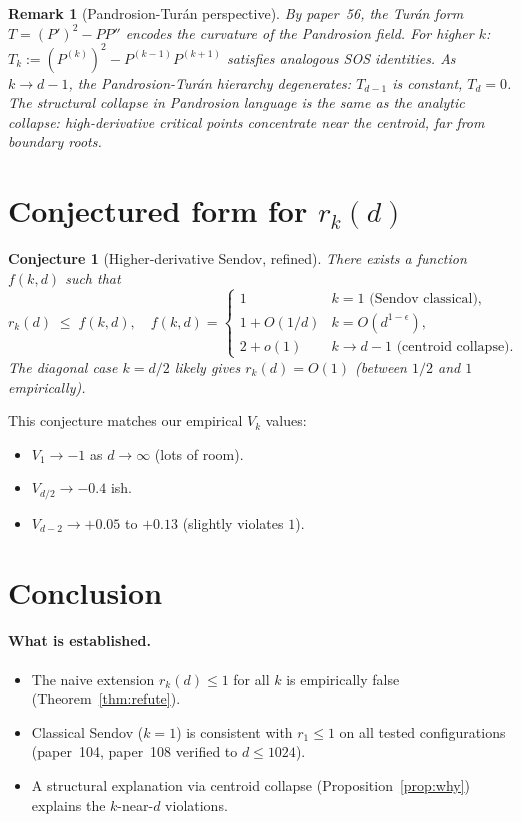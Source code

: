 \documentclass[11pt,a4paper]{article}
\newtheorem{conjecture}[theorem]{Conjecture}
\newtheorem{remark}[theorem]{Remark}
\begin{document}
\begin{remark}[Pandrosion-Turán perspective]
By paper~56, the Turán form $T = (P')^2 - P P''$ encodes the curvature of the
Pandrosion field. For higher $k$: $T_k := (P^{(k)})^2 - P^{(k-1)} P^{(k+1)}$
satisfies analogous SOS identities. As $k \to d - 1$, the Pandrosion-Turán
hierarchy degenerates: $T_{d-1}$ is constant, $T_d = 0$. The structural
collapse in Pandrosion language is the same as the analytic collapse:
high-derivative critical points concentrate near the centroid, far from
boundary roots.
\end{remark}

\section{Conjectured form for $r_k(d)$}\label{sec:conjecture}

\begin{conjecture}[Higher-derivative Sendov, refined]\label{conj:refined}
There exists a function $f(k, d)$ such that
\[
r_k(d) \;\le\; f(k, d), \quad
f(k, d) = \begin{cases}
1 & k = 1 \text{ (Sendov classical)},\\
1 + O(1/d) & k = O(d^{1-\epsilon}),\\
2 + o(1) & k \to d - 1 \text{ (centroid collapse)}.
\end{cases}
\]
The diagonal case $k = d/2$ likely gives $r_k(d) = O(1)$ (between $1/2$ and
$1$ empirically).
\end{conjecture}

This conjecture matches our empirical $V_k$ values:
\begin{itemize}
\item $V_1 \to -1$ as $d \to \infty$ (lots of room).
\item $V_{d/2} \to -0.4$ ish.
\item $V_{d-2} \to +0.05$ to $+0.13$ (slightly violates $1$).
\end{itemize}

\section{Conclusion}\label{sec:conclusion}

\paragraph{What is established.}
\begin{itemize}
\item The naive extension $r_k(d) \le 1$ for all $k$ is empirically false
(Theorem~\ref{thm:refute}).
\item Classical Sendov ($k = 1$) is consistent with $r_1 \le 1$ on all tested
configurations (paper~104, paper~108 verified to $d \le 1024$).
\item A structural explanation via centroid collapse
(Proposition~\ref{prop:why}) explains the $k$-near-$d$ violations.
\end{itemize}
\end{document}
